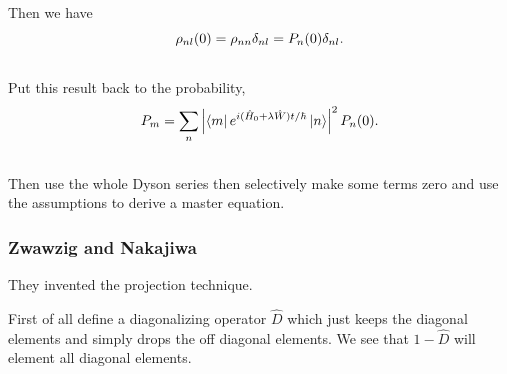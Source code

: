 \documentclass[letterpaper,10pt,english]{sphinxmanual}
\newcommand{\bra}[1]{\left\langle #1\right|}
\newcommand{\ket}[1]{\left| #1\right\rangle}
\begin{document}
Then we have
\begin{gather}
\begin{split}\rho_{nl} (0) = \rho_{nn} \delta_{nl} = P_n(0) \delta_{nl} .\end{split}\notag\\\begin{split}\end{split}\notag
\end{gather}
Put this result back to the probability,
\begin{gather}
\begin{split}P_m = \sum_n \left\vert \bra{m} e^{i (\hat H_0 + \lambda \hat W) t/\hbar } \ket{n} \right\vert^2 P_n(0) .\end{split}\notag\\\begin{split}\end{split}\notag
\end{gather}
Then use the whole Dyson series then selectively make some terms zero and use the assumptions to derive a master equation.


\subsubsection{Zwawzig and Nakajiwa}
\label{nonequilibrium/quantumMasterEqn:zwawzig-and-nakajiwa}
They invented the projection technique.

First of all define a diagonalizing operator $\hat D$ which just keeps the diagonal elements and simply drops the off diagonal elements. We see that $1-\hat D$ will element all diagonal elements.
\end{document}
